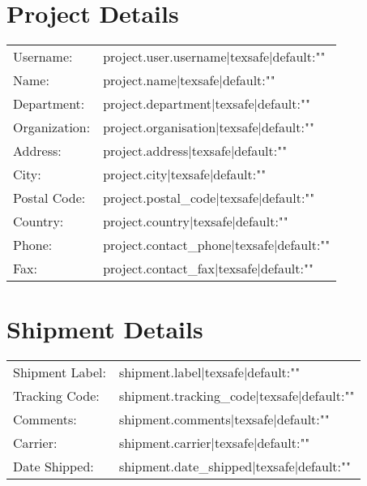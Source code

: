 \documentclass[6pt]{article}
\begin{document}
	\section*{Project Details}
	
	\begin{tabular}{ll}
		Username: & {{ project.user.username|texsafe|default:"" }} \\
		Name: & {{ project.name|texsafe|default:"" }} \\
		Department: & {{ project.department|texsafe|default:"" }} \\
		Organization: & {{ project.organisation|texsafe|default:"" }} \\
		Address: & {{ project.address|texsafe|default:"" }} \\
		City: & {{ project.city|texsafe|default:"" }} \\
		Postal Code: & {{ project.postal_code|texsafe|default:"" }} \\
		Country: & {{ project.country|texsafe|default:"" }} \\
		Phone: & {{ project.contact_phone|texsafe|default:"" }} \\
		Fax: & {{ project.contact_fax|texsafe|default:"" }} \\
	\end{tabular}

	\section*{Shipment Details}

	\begin{tabular}{ll}
		Shipment Label: & {{ shipment.label|texsafe|default:"" }} \\
		Tracking Code: & {{ shipment.tracking_code|texsafe|default:"" }} \\
		Comments: & {{ shipment.comments|texsafe|default:"" }} \\
		Carrier: & {{ shipment.carrier|texsafe|default:"" }} \\
		Date Shipped: & {{ shipment.date_shipped|texsafe|default:"" }} \\
	\end{tabular}
	
\end{document}
